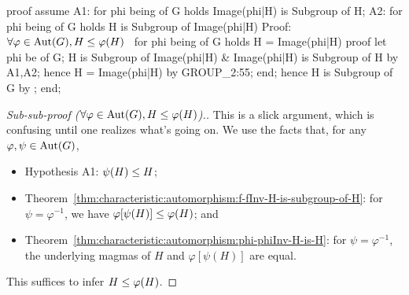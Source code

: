\nwenddocs{}\endmoddef\nwstartdeflinemarkup{}\nwenddeflinemarkup
proof
  assume A1: for phi being  of G
  holds Image(phi|H) is Subgroup of H;
  A2: for phi being  of G holds H is Subgroup of Image(phi|H)
  \LA{}Proof: $\forall\varphi\in\operatorname{Aut}(G),H\leq\varphi(H)$~{\nwtagstyle{}}\RA{}
  for phi being  of G holds H = Image(phi|H)
  proof
    let phi be  of G;
    H is Subgroup of Image(phi|H) & Image(phi|H) is Subgroup of H
    by A1,A2;
    hence H = Image(phi|H) by GROUP_2:55;
  end;
  hence H is  Subgroup of G by ;
end;
\nwendcode{}\nwdocspar

\begin{proof}[Sub-sub-proof ($\forall\varphi\in\operatorname{Aut}(G),H\leq\varphi(H)$).]
This is a slick argument, which is confusing until one realizes
what's going on.  We use the facts that, for any $\varphi,\psi\in\operatorname{Aut}(G)$,
\begin{itemize}
\item Hypothesis {\Tt{}A1\nwendquote}: $\psi(H)\leq H$;
\item Theorem~\ref{thm:characteristic:automorphism:f-fInv-H-is-subgroup-of-H}: for $\psi=\varphi^{-1}$, we have $\varphi[\psi(H)]\leq\varphi(H)$; and
\item Theorem~\ref{thm:characteristic:automorphism:phi-phiInv-H-is-H}: for $\psi=\varphi^{-1}$, the underlying magmas of $H$ and $\varphi[\psi(H)]$ are equal.
\end{itemize}
This suffices to infer $H\leq\varphi(H)$.
\end{proof}

